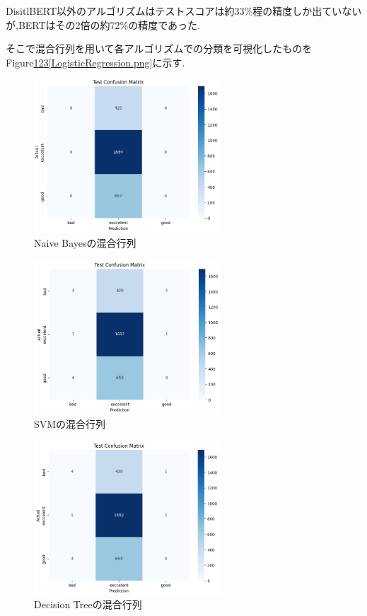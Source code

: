 \documentclass[twocolumn,dvipdfmx]{article}
\begin{document}
DisitlBERT以外のアルゴリズムはテストスコアは約33\%程の精度しか出ていないが,BERTはその2倍の約72\%の精度であった.

そこで混合行列を用いて各アルゴリズムでの分類を可視化したものをFigure\ref{Naivebayse.png}\ref{SVM.png}\ref{DecisionTree.png}\ref{LogisticRegression.png}に示す.

\begin{figure}[H]
\begin{center}
\includegraphics[width=70mm]{Naive_bayse.png}
\caption{Naive Bayesの混合行列}
\label{Naivebayse.png}
\end{center}
\end{figure}

\begin{figure}[H]
\begin{center}
\includegraphics[width=70mm]{SVM.png}
\caption{SVMの混合行列}
\label{SVM.png}
\end{center}
\end{figure}

\begin{figure}[H]
\begin{center}
\includegraphics[width=70mm]{DecisionTree.png}
\caption{Decision Treeの混合行列}
\label{DecisionTree.png}
\end{center}
\end{figure}
\end{document}
